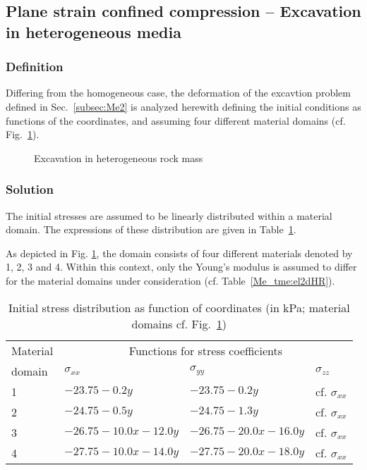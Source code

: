 \subsection{Plane strain confined compression -- Excavation in heterogeneous media}
\label{subsec:Me3}

\subsubsection{Definition}
\label{subsubsec:Me3_def}

Differing from the homogeneous case, the deformation of the excavtion problem defined in Sec.~\ref{subsec:Me2} is analyzed herewith defining the initial conditions as functions of the coordinates, and assuming four different material domains (cf. Fig.~\ref{Me_fme:excav2}).
\begin{figure}[!thb]
  \begin{center}
  \end{center}
  \caption{Excavation in heterogeneous rock mass }
  \label{Me_fme:excav2}
\end{figure}

\subsubsection{Solution}
\label{subsubsec:Me3_sol}

The initial stresses are assumed to be linearly distributed within a material domain. The expressions of these distribution are given in Table~\ref{Me_tab:initialStress}.

As depicted in Fig. \ref{Me_fme:excav2}, the domain consists of four different materials denoted by 1, 2, 3 and 4. Within this context, only the Young's modulus is assumed to differ for the material domains under consideration (cf. Table~\ref{Me_tme:el2dHR}).

\clearpage

\begin{table}[!htb]
\centering
\caption{Initial stress distribution as function of coordinates (in kPa; material domains cf. Fig.~\ref{Me_fme:excav2})}
\label{Me_tab:initialStress}
\begin{tabular}{llll}
\toprule
Material & \multicolumn{3}{c}{Functions for stress coefficients} \\
domain   & $\sigma_{xx}$ & $\sigma_{yy}$ & $\sigma_{zz}$ \\
\noalign{\smallskip}\hline\noalign{\smallskip}
   1  & $-23.75-0.2y$        & $-23.75-0.2y$        & cf. $\sigma_{xx}$ \\
   2  & $-24.75-0.5y$        & $-24.75-1.3y$        & cf. $\sigma_{xx}$ \\
   3  & $-26.75-10.0x-12.0y$ & $-26.75-20.0x-16.0y$ & cf. $\sigma_{xx}$ \\
   4  & $-27.75-10.0x-14.0y$ & $-27.75-20.0x-18.0y$ & cf. $\sigma_{xx}$ \\
\bottomrule
\end{tabular}
\end{table}

